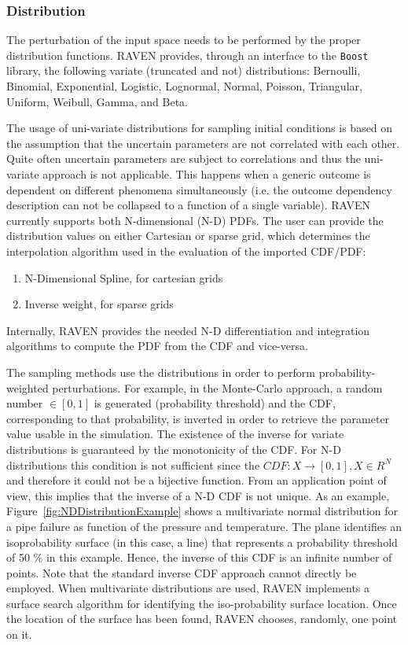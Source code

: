 \subsubsection{Distribution}
The perturbation of the input space  needs to be performed by the proper distribution functions. RAVEN provides, through an interface to the \texttt{Boost} library, the following variate (truncated and not) distributions: Bernoulli, Binomial, Exponential, Logistic, Lognormal, Normal, Poisson, Triangular, Uniform, Weibull, Gamma, and Beta.

The usage of uni-variate distributions for sampling initial conditions is based on the assumption that the uncertain parameters are not correlated with each other. Quite often uncertain parameters are subject to correlations and thus the uni-variate approach is not applicable. This happens when a generic outcome is dependent on different phenomena simultaneously (i.e. the outcome dependency description can not be collapsed to a function of a single variable). RAVEN currently supports both N-dimensional (N-D) PDFs. The user can provide the distribution values on either Cartesian or sparse grid, which determines the interpolation algorithm used in the evaluation of the imported CDF/PDF:
\begin{enumerate}
\item N-Dimensional Spline, for cartesian grids
\item Inverse weight, for sparse grids
\end{enumerate}
Internally, RAVEN provides the needed N-D differentiation and integration algorithms to compute the PDF from the CDF and vice-versa. 

The sampling methods use the distributions in order to perform probability-weighted perturbations. For example, in the Monte-Carlo approach, a random number $\in [0,1]$ is generated (probability threshold) and the CDF, corresponding to that probability, is inverted in order to retrieve the parameter value usable in the simulation. The existence of the inverse for variate distributions is guaranteed by the monotonicity of the CDF. For N-D distributions this condition is not sufficient since the $CDF:X\longrightarrow [0,1],X \in  R^{N} $ and therefore it could not be a bijective function. From an application point of view, this implies that the inverse of a N-D CDF is not unique. 
As an example, Figure~\ref{fig:NDDistributionExample} shows a multivariate normal distribution for a pipe failure as function of the pressure and temperature. The plane identifies an isoprobability surface (in this case, a line) that represents a probability threshold of 50 \% in this example.  Hence, the inverse of this CDF is an infinite number of points.
Note that the standard inverse CDF approach cannot directly be employed. When multivariate distributions are used, RAVEN implements a surface search algorithm for identifying the iso-probability surface location. Once the location of the surface has been found, RAVEN chooses, randomly, one point on it.

